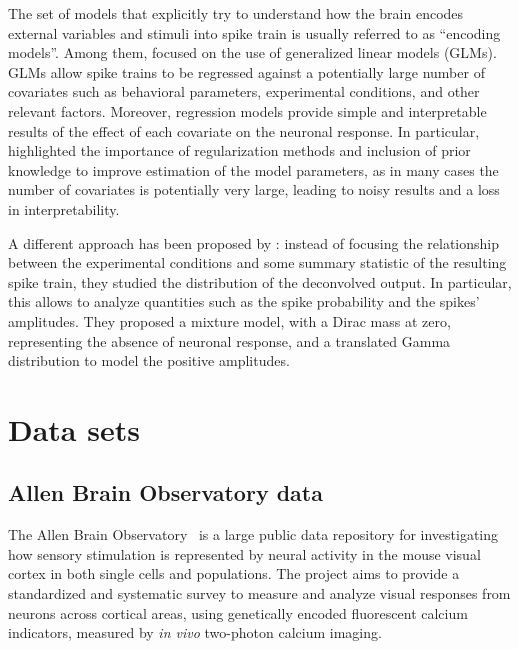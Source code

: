 The set of models that explicitly try to understand how the brain encodes external variables and stimuli into spike train is usually referred to as ``encoding models''. Among them, \textcite{paninski2007} focused on the use of generalized linear models (GLMs). GLMs allow spike trains to be regressed against a potentially large number of covariates such as behavioral parameters, experimental conditions, and other relevant factors.
Moreover, regression models provide simple and interpretable results of the effect of each covariate on the neuronal response.
In particular, \textcite{paninski2007} highlighted the importance of regularization methods and inclusion of prior knowledge to improve estimation of the model parameters, as in many cases the number of covariates is potentially very large, leading to noisy results and a loss in interpretability.

A different approach has been proposed by \textcite{wei2019}: instead of focusing the relationship between the experimental conditions and some summary statistic of the resulting spike train, they studied the distribution of the deconvolved output. In particular, this allows to analyze quantities such as the spike probability and the spikes' amplitudes. They proposed a mixture model, with a Dirac mass at zero, representing the absence of neuronal response, and a translated Gamma distribution to model the positive amplitudes.

\section{Data sets} 

\subsection{Allen Brain Observatory data}
\label{ch1_sec:allen_brain_data}
The Allen Brain Observatory~\parencite{allen, vries2020} is a large public data repository for investigating how sensory stimulation is represented by neural activity in the mouse visual cortex in both single cells and populations.
The project aims to provide a standardized and systematic survey to measure and analyze visual responses from neurons across cortical areas, using genetically encoded fluorescent calcium indicators, measured by \textit{in vivo} two-photon calcium imaging.

